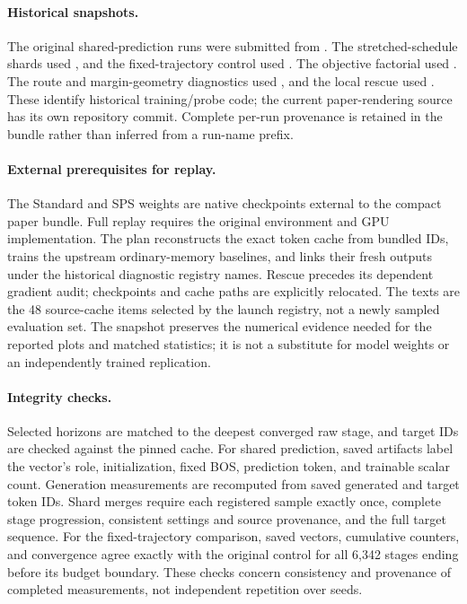 \paragraph{Historical snapshots.}
The original shared-prediction runs were submitted from
.
The stretched-schedule shards used
,
and the fixed-trajectory control used
.
The objective factorial used
.
The route and margin-geometry diagnostics used
,
and the local rescue used
.
These identify historical training/probe code; the current paper-rendering source has its own repository commit.
Complete per-run provenance is retained in the bundle rather than inferred from a run-name prefix.

\paragraph{External prerequisites for replay.}
The Standard and SPS weights are native checkpoints external to the compact paper bundle.
Full replay requires the original environment and GPU implementation.
The plan reconstructs the exact token cache from bundled IDs, trains the upstream ordinary-memory baselines, and links their fresh outputs under the historical diagnostic registry names.
Rescue precedes its dependent gradient audit; checkpoints and cache paths are explicitly relocated.
The texts are the 48 source-cache items selected by the launch registry, not a newly sampled evaluation set.
The snapshot preserves the numerical evidence needed for the reported plots and matched statistics; it is not a substitute for model weights or an independently trained replication.

\paragraph{Integrity checks.}
Selected horizons are matched to the deepest converged raw stage, and target IDs are checked against the pinned cache.
For shared prediction, saved artifacts label the vector's role, initialization, fixed BOS, prediction token, and trainable scalar count.
Generation measurements are recomputed from saved generated and target token IDs.
Shard merges require each registered sample exactly once, complete stage progression, consistent settings and source provenance, and the full target sequence.
For the fixed-trajectory comparison, saved vectors, cumulative counters, and convergence agree exactly with the original control for all 6,342 stages ending before its budget boundary.
These checks concern consistency and provenance of completed measurements, not independent repetition over seeds.

